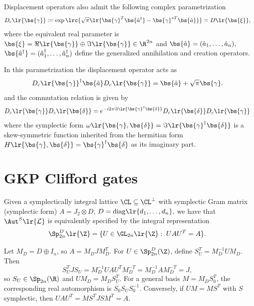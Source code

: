 \documentclass[a4paper, aps, pra, 11pt, onecolumn, tightenlines, superscriptaddress]{revtex4-2}
\begin{document}
Displacement operators also admit the following complex parametrization
\begin{align}
D_c\lr{\bs{\gamma}}\coloneqq\exp\lrc{\sqrt{\pi}\lr{\bs{\gamma}^T\bs{\hat{a}^{\dagger}}-\bs{\gamma}^{* T}\bs{\hat{a}}}} =D\lr{\bs{\xi}},
\end{align}
where the equivalent real parameter is $\bs{\xi}=\Re\lr{\bs{\gamma}}\oplus \Im\lr{\bs{\gamma}}\in \R^{2n}$ and $\bs{\hat{a}}=(\hat{a}_1,\hdots, \hat{a}_n), $ $\bs{\hat{a}^{\dagger}}=(\hat{a}^{\dagger}_1,\hdots, \hat{a}^{\dagger}_n)$ define the generalized annihilation and creation operators. 

In this parametrization the displacement operator acts as
\begin{equation}
D_c\lr{\bs{\gamma}}^{\dagger}\bs{\hat{a}}D_c\lr{\bs{\gamma}}=\bs{\hat{a}}+\sqrt{\pi}\bs{\gamma}.
\end{equation}
and the commutation relation is given by
\begin{equation}
D_c\lr{\bs{\gamma}}D_c\lr{\bs{\delta}}= e^{-i2\pi\Im\lr{ \bs{\gamma}^{\dagger}\bs{\delta}}} D_c\lr{\bs{\delta}}D_c\lr{\bs{\gamma}}
\end{equation}
where the symplectic form $\omega\lr{\bs{\gamma},  \bs{\delta}}=\Im\lr{ \bs{\gamma}^{\dagger}\bs{\delta}}$ is a skew-symmetric function inherited from the hermitian form $H\lr{\bs{\gamma}, \bs{\delta}}= \bs{\gamma}^{\dagger}\bs{\delta}$ as its imaginary part.


\section{GKP Clifford gates}\label{app:Cliff}

\begin{lem}\label{lem:integral_rep}
    Given a symplectically integral lattice $\CL \subseteq\CL^{\perp}$ with symplectic Gram matrix (symplectic form) $A=J_2\otimes D$, $D=\mathrm{diag}\lr{d_1,\hdots, d_n},$ we have that
    $\Aut^S\lr{\mathcal{L}}$ is equivalently specified by the integral representation
    \begin{equation}
        \Sp_{2n}^D\lr{\Z}=\{U\in \GL_{2n}\lr{\Z}:\; UAU^T=A\}.
    \end{equation}
\end{lem}

\proof
Let $M_D=D\oplus I_n$, so $A=M_DJM_D^T$. For $U\in\Sp_{2n}^D(\Z)$, define $S_U^T=M_D^{-1}UM_D$. Then
\begin{equation}
S_U^TJS_U=M_D^{-1}UAU^TM_D^{-T}=M_D^{-1}AM_D^{-T}=J,
\end{equation}
so $S_U\in\Sp_{2n}(\R)$ and $UM_D=M_DS_U^T$. For a general basis $M=M_DS_0^T$, the corresponding real automorphism is $S_0S_US_0^{-1}$. Conversely, if $UM=MS^T$ with $S$ symplectic, then $UAU^T=MS^TJSM^T=A$.
\endproof
\end{document}
